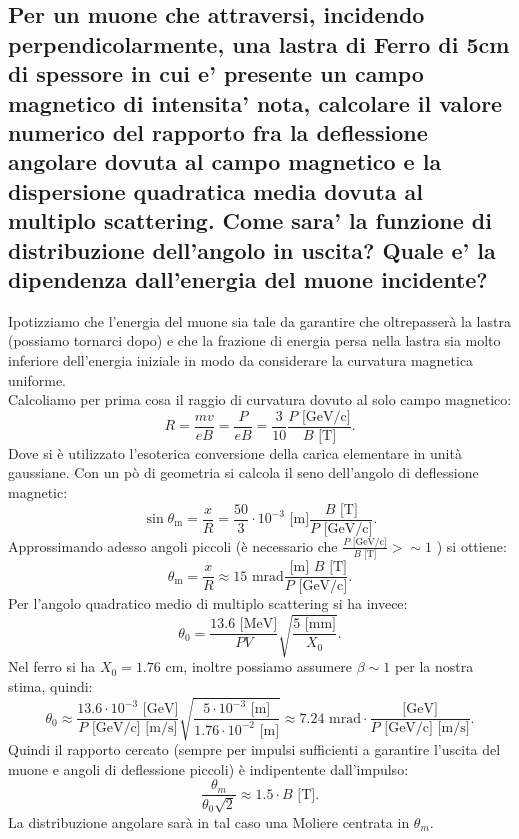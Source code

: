 \subsection[\hspace{1mm} Angolo di flessione di un Muone in materiale con campo magnetico ]{Per un muone che attraversi, incidendo perpendicolarmente, una lastra di Ferro di 5cm di spessore in cui e' presente un campo magnetico di intensita' nota, calcolare il valore numerico del rapporto fra la deflessione angolare dovuta al campo magnetico e la dispersione quadratica media dovuta al multiplo scattering. Come sara’ la funzione di distribuzione dell’angolo in uscita? Quale e’ la dipendenza dall’energia del muone incidente?
}
\label{sec:4.b.20}
Ipotizziamo che l'energia del muone sia tale da garantire che oltrepasserà la lastra (possiamo tornarci dopo) e che la frazione di energia persa nella lastra sia molto inferiore dell'energia iniziale in modo da considerare la curvatura magnetica uniforme.\\
Calcoliamo per prima cosa il raggio di curvatura dovuto al solo campo magnetico:
\[
	R= \frac{mv}{eB}= \frac{P}{e B} = \frac{3}{10} \frac{P  \text{ [GeV/c]}}{B \text{ [T]}}
.\] 
Dove si è utilizzato l'esoterica conversione della carica elementare in unità gaussiane. Con un pò di geometria si calcola il seno dell'angolo di deflessione magnetic:
\[
	\sin\theta_{\text{m}}= \frac{x}{R} = \frac{50}{3} \cdot 10^{-3}\text{ [m]}  \frac{B \text{ [T]}}{P  \text{ [GeV/c]}}
.\] 
Approssimando adesso angoli piccoli (è necessario che $ \frac{P \text{ [GeV/c]}}{B \text{ [T]}}>\sim 1$ ) si ottiene:
\[
	\theta_{\text{m}}= \frac{x}{R} \approx 15 \text{ mrad}  \frac{\text{ [m] } B \text{ [T]}}{P  \text{ [GeV/c]}}
.\] 
Per l'angolo quadratico medio di multiplo scattering si ha invece:
\[
	\theta_0= \frac{13.6 \text{ [MeV]}}{PV} \sqrt{ \frac{5 \text{ [mm]}}{X_0}} 
.\] 
Nel ferro si ha $X_0 = 1.76$ cm, inoltre possiamo assumere $\beta \sim 1$ per la nostra stima, quindi:
\[
	\theta_0 \approx \frac{13.6 \cdot 10^{-3} \text{ [GeV]}}{P \text{ [GeV/c] [m/s]}} \sqrt{ \frac{5 \cdot 10^{-3}\text{ [m]} }{1.76 \cdot 10^{-2}\text{ [m]}}}
	\approx 7.24 \text{ mrad} \cdot \frac{\text{[GeV]}}{P\text{ [GeV/c] [m/s]} }
.\] 
Quindi il rapporto cercato (sempre per impulsi sufficienti a garantire l'uscita del muone e angoli di deflessione piccoli) è indipentente dall'impulso:
\[
	\frac{\theta_{m}}{\theta_0 \sqrt{2}} \approx 1.5 \cdot B \text{ [T]}
.\]
La distribuzione angolare sarà in tal caso una Moliere centrata in $\theta_{m}$.

